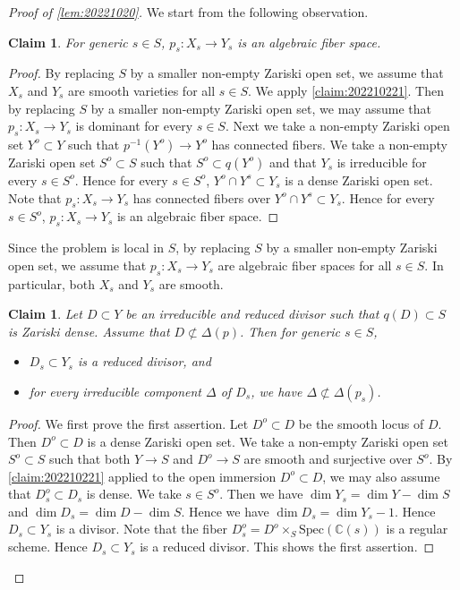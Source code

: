 \documentclass[11pt,english]{smfart}
\theoremstyle{plain}
\newtheorem{claim}[thm]{Claim}
\theoremstyle{definition}
\theoremstyle{remark}
\numberwithin{equation}{subsection}
\theoremstyle{plain}
\begin{document}
\begin{proof}[Proof of \cref{lem:20221020}]
We start from the following observation.

\begin{claim}
For generic $s\in S$, $p_s:X_s\to Y_s$ is an algebraic fiber space.
\end{claim}
\begin{proof}
By replacing $S$ by a smaller non-empty Zariski open set, we assume that $X_s$ and $Y_s$ are smooth varieties for all $s\in S$.
We apply \cref{claim:202210221}.
Then by replacing $S$ by a smaller non-empty Zariski open set, we may assume that $p_s:X_s\to Y_s$ is dominant for every $s\in S$.
Next we take a non-empty Zariski open set $Y^o\subset Y$ such that $p^{-1}(Y^o)\to Y^o$ has connected fibers.
We take a non-empty Zariski open set $S^o\subset S$ such that $S^o\subset q(Y^o)$ and that $Y_s$ is irreducible for every $s\in S^o$.
Hence for every $s\in S^o$, $Y^o\cap Y^s\subset Y_s$ is a dense Zariski open set.
Note that $p_s:X_s\to Y_s$ has connected fibers over $Y^o\cap Y^s\subset Y_s$.
Hence for every $s\in S^o$, $p_s:X_s\to Y_s$ is an algebraic fiber space.
\end{proof}


Since the problem is local in $S$, by replacing $S$ by a smaller non-empty Zariski open set, we assume that $p_s:X_s\to Y_s$ are algebraic fiber spaces for all $s\in S$.
In particular, both $X_s$ and $Y_s$ are smooth.

\begin{claim}\label{claim:202210222}
Let $D\subset Y$ be an irreducible and reduced divisor such that $q(D)\subset S$ is Zariski dense.
Assume that $D\not\subset \Delta(p)$.
Then for generic $s\in S$,
\begin{itemize}
\item
$D_s\subset Y_s$ is a reduced divisor, and
\item
for every irreducible component $\Delta$ of $D_s$, we have $\Delta\not\subset \Delta(p_s)$.
\end{itemize} 
\end{claim}

\begin{proof}
We first prove the first assertion.
Let $D^o\subset D$ be the smooth locus of $D$.
Then $D^o\subset D$ is a dense Zariski open set.
We take a non-empty Zariski open set $S^o\subset S$ such that both $Y\to S$ and $D^o\to S$ are smooth and surjective over $S^o$.
By \cref{claim:202210221} applied to the open immersion $D^o\subset D$, we may also assume that $D^o_s\subset D_s$ is dense.
We take $s\in S^o$.
Then we have $\dim Y_s=\dim Y-\dim S$ and $\dim D_s=\dim D-\dim S$.
Hence we have $\dim D_s=\dim Y_s-1$.
Hence $D_s\subset Y_s$ is a divisor.
Note that the fiber $D^o_s=D^o\times_S\mathrm{Spec}(\mathbb C(s))$ is a regular scheme.
Hence $D_s\subset Y_s$ is a reduced divisor.
This shows the first assertion.


\end{proof}
\end{proof}
\end{document}
